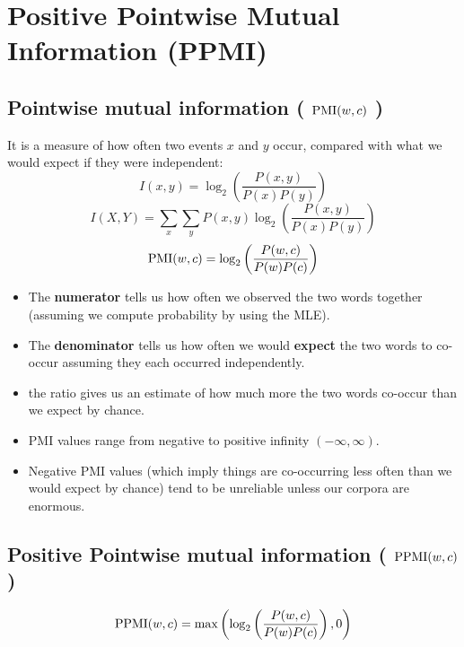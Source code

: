 \chapter{Positive Pointwise Mutual Information (PPMI) \cite{nlp-1}}

\section{Pointwise mutual information ( $\operatorname{PMI}(w,c)$ ) \cite{nlp-1}}
It is a measure of how often two events $x$ and $y$ occur, compared with what we would expect if they were independent:
\[
    I(x,y) = \log_2\left(\displaystyle\dfrac{P(x,y)}{P(x)P(y)}\right)
\]
\[
    \displaystyle I(X,Y) = \sum_x \sum_y P(x,y) \log_2\left(\dfrac{P(x,y)}{P(x)P(y)}\right)
\]
\[
    \operatorname{PMI}(w,c) = \log_2\left(\displaystyle\dfrac{P(w,c)}{P(w)P(c)}\right)
\]

\begin{itemize}
    \item The \textbf{numerator} tells us how often we observed the two words together (assuming we compute probability by using the MLE).

    \item The \textbf{denominator} tells us how often we would \textbf{expect} the two words to co-occur assuming they each occurred independently.

    \item the ratio gives us an estimate of how much more the two words co-occur than we expect by chance.

    \item PMI values range from negative to positive infinity $(-\infty, \infty)$.

    \item Negative PMI values (which imply things are co-occurring less often than we would expect by chance) tend to be unreliable unless our corpora are enormous.

    
\end{itemize}


\section{Positive Pointwise mutual information ( $\operatorname{PPMI}(w,c)$ ) \cite{nlp-1}}\label{Positive Pointwise Mutual Information (PPMI)}

\[
    \operatorname{PPMI}(w,c) = \max\left(\log_2\left(\displaystyle\dfrac{P(w,c)}{P(w)P(c)}\right), 0\right)
\]


